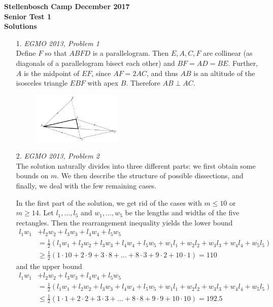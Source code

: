 \documentclass[a4paper, 12pt]{article}
\begin{document}
\begin{center}
\textbf{Stellenbosch Camp December 2017 \\ Senior Test 1} \\
\textbf{Solutions}
\end{center}

\begin{enumerate}

    \item[1.] \textit{EGMO 2013, Problem 1} \\
    Define $F$ so that $ABFD$ is a parallelogram. Then $E, A, C, F$ are collinear (as diagonals of a parallelogram bisect each other) and $BF = AD = BE$. Further, $A$ is the midpoint of $EF$, since $AF = 2AC$, and thus $AB$ is an altitude of the isosceles triangle $EBF$ with apex $B$. Therefore $AB \perp AC$.
    
    \begin{figure}[h!]
        \centering
        \includegraphics[width=0.4\textwidth]{seniortest1_q1.PNG}
    \end{figure}
    
    \item[2.] \textit{EGMO 2013, Problem 2} \\
    The solution naturally divides into three different parts: we first obtain some bounds on $m$. We then describe the structure of possible dissections, and finally, we deal with the few remaining cases.
    
    In the first part of the solution, we get rid of the cases with $m \leq 10$ or $m \geq 14$. Let $l_1, \dots, l_5$  and $w_1, \dots, w_5$ be the lengths and widths of the five rectangles. Then the rearrangement inequality yields the lower bound
    \begin{align*}
        l_1 w_1 &+ l_2 w_2 + l_3 w_3 + l_4 w_4 + l_5 w_5 \\
        &= \frac{1}{2} \left( l_1 w_1 + l_2 w_2 + l_3 w_3 + l_4 w_4 + l_5 w_5 + w_1 l_1 + w_2 l_2 + w_3 l_3 + w_4 l_4 + w_5 l_5 \right) \\
        &\geq \frac{1}{2} \left( 1 \cdot 10 + 2 \cdot 9 + 3 \cdot 8 + \dots + 8 \cdot 3 + 9 \cdot 2 + 10 \cdot 1 \right) = 110
    \end{align*}
and the upper bound
    \begin{align*}
        l_1 w_1 &+ l_2 w_2 + l_3 w_3 + l_4 w_4 + l_5 w_5 \\
        &= \frac{1}{2} \left( l_1 w_1 + l_2 w_2 + l_3 w_3 + l_4 w_4 + l_5 w_5 + w_1 l_1 + w_2 l_2 + w_3 l_3 + w_4 l_4 + w_5 l_5 \right) \\
        &\leq \frac{1}{2} \left( 1 \cdot 1 + 2 \cdot 2 + 3 \cdot 3 + \dots + 8 \cdot 8 + 9 \cdot 9 + 10 \cdot 10 \right) = 192.5
    \end{align*}



\end{enumerate}
\end{document}
